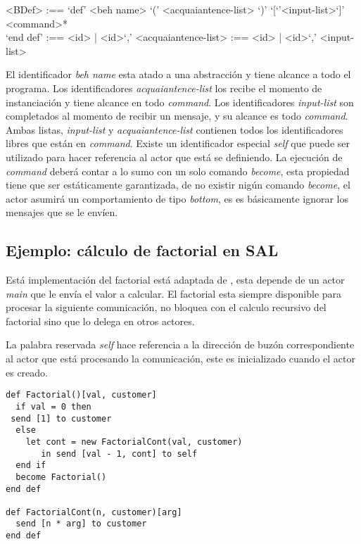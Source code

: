 \documentclass[fleqn]{article}
\begin{document}
\begin{grammar}
 <BDef> :== `def' <beh name> `(' <acquaiantence-list> `)' `[`'<input-list>`]' \\
  \quad <command>* \\
  `end def'
   :== <id> | <id>`,' <acquaiantence-list>
   :== <id> | <id>`,' <input-list>
\end{grammar}

El identificador \textit{beh name} esta atado a una abstracción y tiene alcance
a todo el programa. Los identificadores \textit{acquaiantence-list} los recibe el
momento de instanciación y tiene alcance en todo \textit{command}. Los
identificadores \textit{input-list} son completados al momento de recibir un
mensaje, y su alcance es todo \textit{command}.
Ambas listas, \textit{input-list} y \textit{acquaiantence-list} contienen todos
los identificadores libres que están en \textit{command}. Existe un
identificador especial \textit{self} que puede ser utilizado para hacer
referencia al actor que está se definiendo.
La ejecución de \textit{command} deberá contar a lo sumo con un solo comando
\textit{become}, esta propiedad tiene que ser estáticamente garantizada, de no
existir nigún comando \textit{become}, el actor asumirá un comportamiento de
tipo \textit{bottom}, es es básicamente ignorar los mensajes que se le envíen.

\subsection{Ejemplo: cálculo de factorial en SAL}

Está implementación del factorial está adaptada de \cite{Agha:1986:AMC:7929}, esta
depende de un actor \textit{main} que le envía el valor a calcular. El factorial
esta siempre disponible para procesar la siguiente comunicación, no bloquea con
el calculo recursivo del factorial sino que lo delega en otros actores.

La palabra reservada \textit{self} hace referencia a la dirección de buzón
correspondiente al actor que está procesando la comunicación, este es inicializado
cuando el actor es creado.

\begin{lstlisting}[language=sal, style=simple]
def Factorial()[val, customer]
  if val = 0 then
 send [1] to customer
  else
    let cont = new FactorialCont(val, customer)
       in send [val - 1, cont] to self
  end if
  become Factorial()
end def

def FactorialCont(n, customer)[arg] 
  send [n * arg] to customer
end def
\end{lstlisting}
\end{document}
